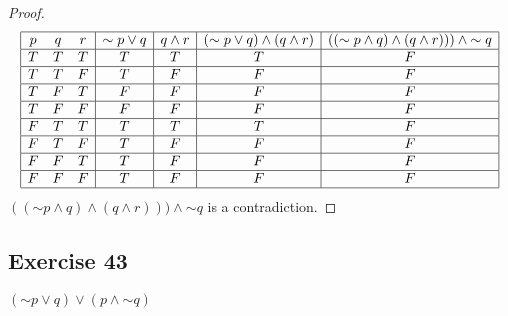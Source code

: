 \documentclass[14pt]{extarticle}
\begin{document}
\begin{proof}
    $$
        \begin{array}{|ccc|c|c|c|c|}
            \hline
            p & q & r & {\sim p} \vee q & q \wedge r & ({\sim p} \vee q) \wedge (q \wedge r) & (({\sim p} \wedge q) \wedge (q \wedge r))) \wedge {\sim q} \\
            \hline
            T & T & T & T               & T          & T                                     & F                                                          \\
            \hline
            T & T & F & T               & F          & F                                     & F                                                          \\
            \hline
            T & F & T & F               & F          & F                                     & F                                                          \\
            \hline
            T & F & F & F               & F          & F                                     & F                                                          \\
            \hline
            F & T & T & T               & T          & T                                     & F                                                          \\
            \hline
            F & T & F & T               & F          & F                                     & F                                                          \\
            \hline
            F & F & T & T               & F          & F                                     & F                                                          \\
            \hline
            F & F & F & T               & F          & F                                     & F                                                          \\
            \hline
        \end{array}
    $$
    $(({\sim p} \wedge q) \wedge (q \wedge r))) \wedge {\sim q}$ is a contradiction.
\end{proof}

\subsection{Exercise 43}
$({\sim p} \vee q) \vee (p \wedge {\sim q})$
\end{document}
